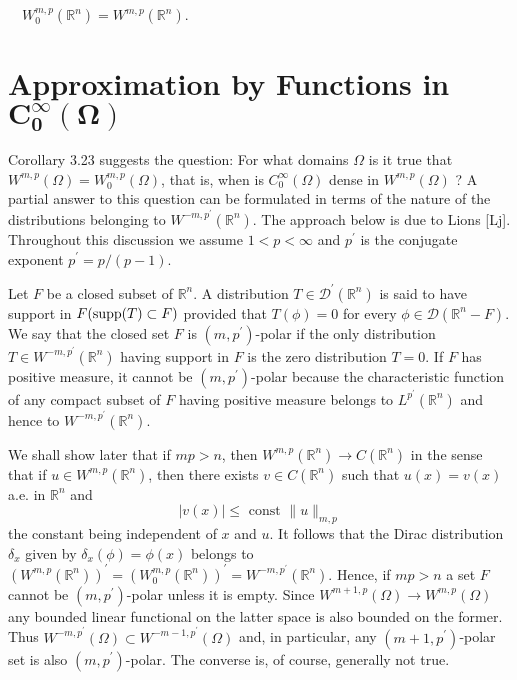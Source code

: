 \begin{corollary}
  $\quad W_0^{m, p}\left(\mathbb{R}^n\right)=W^{m, p}\left(\mathbb{R}^n\right)$.
\end{corollary}


\section[Approximation by Functions in $C_0^\infty (\Omega)$]%
  {Approximation by Functions in $\bm{C_0^\infty (\Omega)}$}


\begin{para}
  Corollary 3.23 suggests the question: For what domains $\Omega$ is it true
  that $W^{m,p}(\Omega)=W_0^{m, p}(\Omega)$, that is, when is $C_0^{\infty}(\Omega)$
  dense in $W^{m,p}(\Omega)$ ? A partial answer to this question can be formulated in terms of 
  the nature of the distributions belonging to $W^{-m, p^{\prime}}\left(\mathbb{R}^n\right)$.
  The approach below is due to Lions [Lj]. Throughout this discussion we assume $1<p<\infty$
  and $p^{\prime}$ is the conjugate exponent $p^{\prime}=p /(p-1)$.
\end{para}

\begin{para}
  Let $F$ be a closed subset of $\mathbb{R}^n$.
  A distribution $T \in \mathscr{D}^{\prime}\left(\mathbb{R}^n\right)$ is said to have support
  in $F(\operatorname{supp}(T) \subset F)$ provided that $T(\phi)=0$ for every
  $\phi \in \mathscr{D}\left(\mathbb{R}^n-F\right)$.
  We say that the closed set $F$ is $\left(m, p^{\prime}\right)$-polar if the only
  distribution $T \in W^{-m, p^{\prime}}\left(\mathbb{R}^n\right)$ having support in $F$ is
  the zero distribution $T=0$. If $F$ has positive measure,
  it cannot be $\left(m, p^{\prime}\right)$-polar because the characteristic function of any 
  compact subset of $F$ having positive measure belongs
  to $L^{p^{\prime}}\left(\mathbb{R}^n\right)$ and hence
  to $W^{-m, p^{\prime}}\left(\mathbb{R}^n\right)$.
\end{para}

We shall show later that if $m p>n$,
then $W^{m,p}\left(\mathbb{R}^n\right) \rightarrow C\left(\mathbb{R}^n\right)$ in the sense that 
if $u \in W^{m, p}\left(\mathbb{R}^n\right)$, then there exists $v \in C\left(\mathbb{R}^n\right)$ 
such that $u(x)=v(x)$ a.e. in $\mathbb{R}^n$ and
\[
|v(x)| \leq \text { const }\|u\|_{m, p}
\]
the constant being independent of $x$ and $u$. It follows that the Dirac distribution $\delta_x$ 
given by $\delta_x(\phi)=\phi(x)$ belongs to
$\left(W^{m, p}\left(\mathbb{R}^n\right)\right)^{\prime}=\left(W_0^{m, p}\left(\mathbb{R}^n\right)\right)^{\prime}=W^{-m, p^{\prime}}\left(\mathbb{R}^n\right)$.
Hence, if $m p>n$ a set $F$ cannot be $\left(m, p^{\prime}\right)$-polar unless it is empty.
Since $W^{m+1, p}(\Omega) \rightarrow W^{m, p}(\Omega)$ any bounded linear functional on the 
latter space is also bounded on the former.
Thus $W^{-m, p^{\prime}}(\Omega) \subset W^{-m-1, p^{\prime}}(\Omega)$ and, in particular,
any $\left(m+1, p^{\prime}\right)$-polar set is also $\left(m, p^{\prime}\right)$-polar.
The converse is, of course, generally not true.


